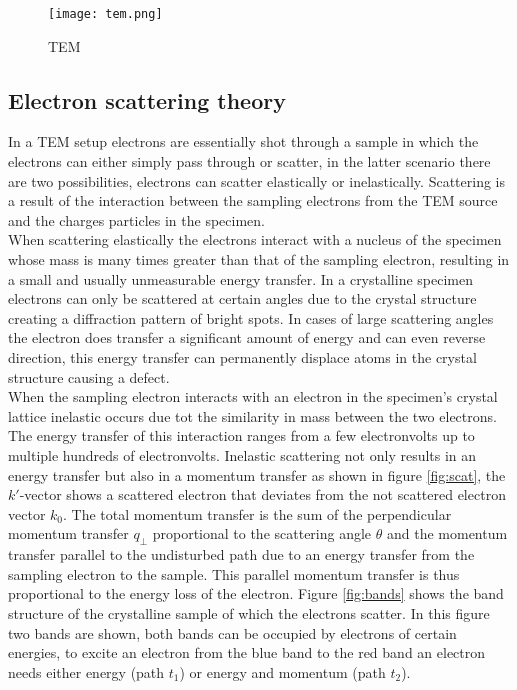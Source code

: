

\begin{figure}
	\centering
	\texttt{[image: tem.png]}
	\caption{TEM}
	\label{fig:tem}
\end{figure}

\subsection{Electron scattering theory}
In a TEM setup electrons are essentially shot through a sample in which the electrons can either simply pass through or scatter, in the latter scenario there are two possibilities, electrons can scatter elastically or inelastically.
Scattering is a result of the interaction between the sampling electrons from the TEM source and the charges particles in the specimen.\\
When scattering elastically the electrons interact with a nucleus of the specimen whose mass is many times greater than that of the sampling electron, resulting in a small and usually unmeasurable energy transfer.
In a crystalline specimen electrons can only be scattered at certain angles due to the crystal structure creating a diffraction pattern of bright spots. In cases of large scattering angles the electron does transfer a significant amount of energy and can even reverse direction, this energy transfer can permanently displace atoms in the crystal structure causing a defect.\\
When the sampling electron interacts with an electron in the specimen's crystal lattice inelastic occurs due tot the similarity in mass between the two electrons. The energy transfer of this interaction ranges from a few electronvolts up to multiple hundreds of electronvolts.
Inelastic scattering not only results in an energy transfer but also in a momentum transfer as shown in figure \ref{fig:scat}, the $k'$-vector shows a scattered electron that deviates from the not scattered electron vector $k_0$.
The total momentum transfer is the sum of the perpendicular momentum transfer $q_{\perp}$ proportional to the scattering angle $\theta$ and the momentum transfer parallel to the undisturbed path due to an energy transfer from the sampling electron to the sample. This parallel momentum transfer is thus proportional to the energy loss of the electron.
Figure \ref{fig:bands} shows the band structure of the crystalline sample of which the electrons scatter. In this figure two bands are shown, both bands can be occupied by electrons of certain energies, to excite an electron from the blue band to the red band an electron needs either energy (path $t_1$) or energy and momentum (path $t_2$).
